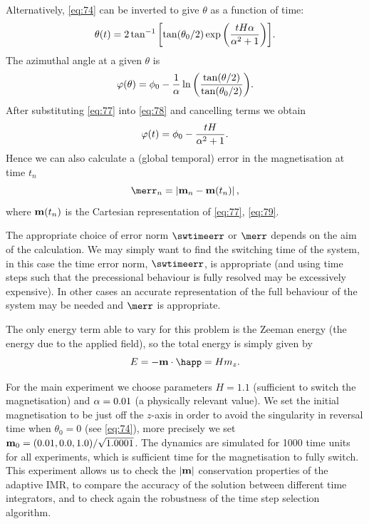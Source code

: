 Alternatively, \cref{eq:74} can be inverted to give $\theta$ as a function of time:
\begin{equation}
  \theta(t) = 2 \tan^{-1} {\left[  \tan(\theta_0/2) \exp{\left( \frac{tH\alpha}{\alpha^2 + 1} \right)} \right]}.
\label{eq:77}
\end{equation}
The azimuthal angle at a given $\theta$ is \cite{Mallinson2000}
\begin{equation}
  \varphi(\theta) = \phi_0 -  \frac{1}{\alpha} \ln {\left(  \frac{\tan(\theta/2)}{\tan(\theta_0/2)}  \right)}.
\label{eq:78}
\end{equation}
After substituting \cref{eq:77} into \cref{eq:78} and cancelling terms we obtain
\begin{equation}
  \varphi(t) = \phi_0 - \frac{tH}{\alpha^2 + 1}.
  \label{eq:79}
\end{equation}
Hence we can also calculate a (global temporal) error in the magnetisation at time $t_n$
\begin{equation}
  \merr_n = \abs{\mv_n - \mv(t_n)},
\label{eq:m-sphere-error}
\end{equation}
where $\boldsymbol{\mathrm{m}}(t_n)$ is the Cartesian representation of \cref{eq:77}, \cref{eq:79}.

The appropriate choice of error norm $\swtimeerr$ or $\merr$ depends on the aim of the calculation.
We may simply want to find the switching time of the system, in this case the time error norm, $\swtimeerr$, is appropriate (and using time steps such that the precessional behaviour is fully resolved may be excessively expensive).
In other cases an accurate representation of the full behaviour of the system may be needed and $\merr$ is appropriate.

The only energy term able to vary for this problem is the Zeeman energy (the energy due to the
applied field), so the total energy is simply given by
\begin{equation}
  E = - \mv \cdot \happ = H m_z.
\end{equation}

For the main experiment we choose parameters $H = 1.1$ (sufficient to switch the magnetisation) and $\alpha = 0.01$ (a physically relevant value).
We set the initial magnetisation to be just off the $z$-axis in order to avoid the singularity in reversal time when $\theta_0 = 0$ (see \cref{eq:74}), more precisely we set $\boldsymbol{\mathrm{m}}_0 = (0.01, 0.0, 1.0)/\sqrt{1.0001}$.
The dynamics are simulated for 1000 time units for all experiments, which is sufficient time for the magnetisation to fully switch.
This experiment allows us to check the $\left|{\boldsymbol{\mathrm{m}}} \right|$ conservation properties of the adaptive IMR, to compare the accuracy of the solution between different time integrators, and to check again the robustness of the time step selection algorithm.


